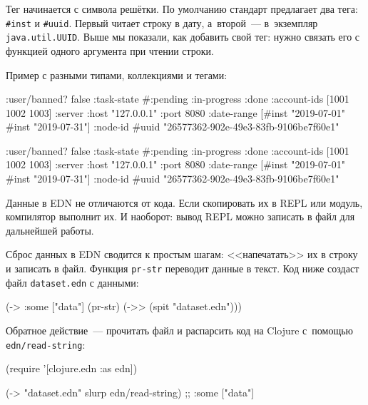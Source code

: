 
Тег начинается с символа решётки. По умолчанию стандарт предлагает два тега:
\verb|#inst| и \verb|#uuid|. Первый читает строку в дату, а~второй~---
в~экземпляр \verb|java.util.UUID|. Выше мы показали, как добавить свой тег:
нужно связать его с функцией одного аргумента при чтении строки.

Пример с разными типами, коллекциями и тегами:

\ifnarrow

\begin{english}
  \begin{clojure}
{:user/banned? false
 :task-state
 #{:pending :in-progress :done}
 :account-ids
 [1001 1002 1003]
 :server
 {:host "127.0.0.1" :port 8080}
 :date-range
 [#inst "2019-07-01" #inst "2019-07-31"]
 :node-id #uuid
 "26577362-902e-49e3-83fb-9106be7f60e1"}
  \end{clojure}
\end{english}

\else

\begin{english}
  \begin{clojure}
{:user/banned? false
 :task-state #{:pending :in-progress :done}
 :account-ids [1001 1002 1003]
 :server {:host "127.0.0.1" :port 8080}
 :date-range [#inst "2019-07-01" #inst "2019-07-31"]
 :node-id #uuid "26577362-902e-49e3-83fb-9106be7f60e1"}
  \end{clojure}
\end{english}

\fi

Данные в EDN не отличаются от кода. Если скопировать их в REPL или модуль,
компилятор выполнит их. И наоборот: вывод REPL можно записать в файл для
дальнейшей работы.

Сброс данных в EDN сводится к простым шагам: <<напечатать>> их в строку и
записать в файл. Функция \verb|pr-str| переводит данные в текст. Код ниже
создаст файл \verb|dataset.edn| с данными:

\begin{english}
  \begin{clojure}
(-> {:some ["data"]}
    (pr-str)
    (->> (spit "dataset.edn")))
  \end{clojure}
\end{english}

Обратное действие~--- прочитать файл и распарсить код на Clojure с~помощью
\verb|edn/read-string|:

\begin{english}
  \begin{clojure}
(require '[clojure.edn :as edn])

(-> "dataset.edn" slurp edn/read-string)
;; {:some ["data"]}
  \end{clojure}
\end{english}

